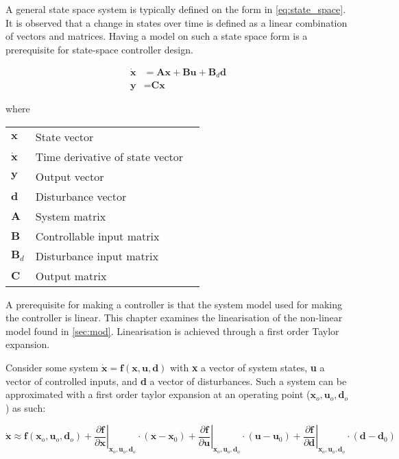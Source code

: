 A general state space system is typically defined on the form in \cref{eq:state_space}. It is observed that a change in states over time is defined as a linear combination of vectors and matrices. Having a model on such a state space form is a prerequisite for state-space controller design.

\begin{equation} \label{eq:state_space}
	\begin{split}
		\dot{\textbf{x}} & = \textbf{A}\textbf{x} + \textbf{B}\textbf{u} + \textbf{B}_d\textbf{d} \\
		\textbf{y} 		& = \textbf{C}\textbf{x}
	\end{split}
\end{equation}

where

\begin{center}
	\begin{tabular}{l p{8cm} l}
		$\textbf{x}$       & State vector                    &  \\
		$\dot{\textbf{x}}$ & Time derivative of state vector &  \\
		$\textbf{y}$       & Output vector                   &  \\
		$\textbf{d}$       & Disturbance vector              &  \\
		$\textbf{A}$       & System matrix                   &  \\
		$\textbf{B}$       & Controllable input matrix       &  \\
		$\textbf{B}_d$     & Disturbance input matrix        &  \\
		$\textbf{C}$       & Output matrix                   &
	\end{tabular}
\end{center}

A prerequisite for making a controller is that the system model used for making the controller is linear. This chapter examines the linearisation of the non-linear model found in \cref{sec:mod}. Linearisation is achieved through a first order Taylor expansion.

Consider some system $\dot{\textbf{x}} = \textbf{f}(\textbf{x},\textbf{u},\textbf{d})$ with \textbf{x} a vector of system states, \textbf{u} a vector of controlled inputs, and \textbf{d} a vector of disturbances. Such a system can be approximated with a first order taylor expansion at an operating point ($\textbf{x}_o, \textbf{u}_o, \textbf{d}_o$) as such:

\begin{equation} \label{eq:taylor}
	\dot{\textbf{x}}   \approx   \textbf{f}(\textbf{x}_o, \textbf{u}_o, \textbf{d}_o)   +
	\left. \dfrac{\partial \textbf{f}}{\partial \textbf{x}} \right |_{\textbf{x}_o, \textbf{u}_o, \textbf{d}_o} \cdot (\textbf{x}-\textbf{x}_0) +
	\left. \dfrac{\partial \textbf{f}}{\partial \textbf{u}} \right |_{\textbf{x}_o, \textbf{u}_o, \textbf{d}_o} \cdot (\textbf{u}-\textbf{u}_0) +
	\left. \dfrac{\partial \textbf{f}}{\partial \textbf{d}} \right |_{\textbf{x}_o, \textbf{u}_o, \textbf{d}_o} \cdot (\textbf{d}-\textbf{d}_0)
\end{equation}

